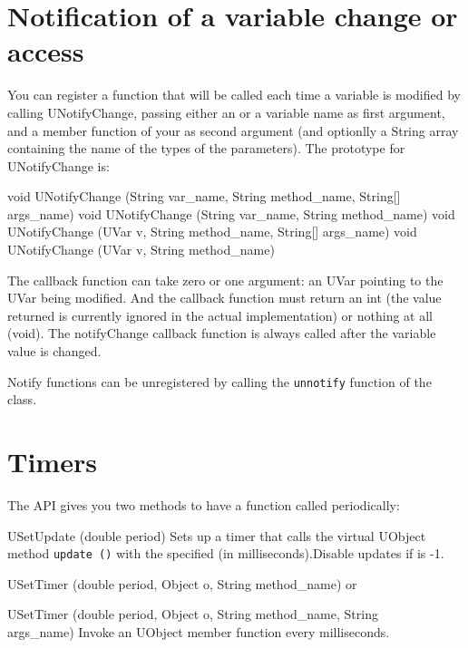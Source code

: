 \section{Notification of a variable change or access}
\label{sec:uob:apijava:uvar-notify}

You can register a function that will be called each time a
variable is modified by calling UNotifyChange, passing either an \UVar
or a variable name as first argument, and a member function of
your \UObject as second argument (and optionlly a String array containing
the name of the types of the parameters). The prototype for UNotifyChange is:

\begin{cxx}
void UNotifyChange (String var_name, String method_name, String[] args_name)
void UNotifyChange (String var_name, String method_name)
void UNotifyChange (UVar v, String method_name, String[] args_name)
void UNotifyChange (UVar v, String method_name)
\end{cxx}

The callback function can take zero or one argument: an UVar pointing to the
UVar being modified. And the callback function must return an int (the value
returned is currently ignored in the actual implementation) or nothing at all (void).
The notifyChange callback function is always called after the variable value
is changed.

Notify functions can be unregistered by calling the \lstinline|unnotify|
function of the \UVar class.

\section{Timers}
\label{sec:uob:apijava:timers}

The API gives you two methods to have a function called periodically:

\begin{cxxapi}
\item[USetUpdate (double period)] Sets up a timer that calls the virtual
  UObject method \lstinline{update ()} with the specified  (in
  milliseconds).Disable updates if  is -1.
\item[USetTimer (double period, Object o, String method\_name)] or
\item[USetTimer (double period, Object o, String method\_name, String\[\] args\_name)]
 Invoke an UObject member function  every  milliseconds.
\end{cxxapi}


